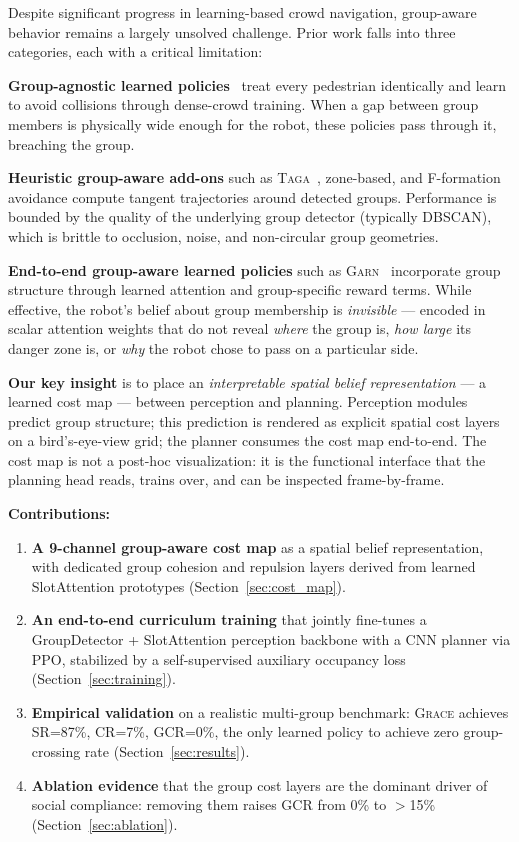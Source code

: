 \documentclass{article}
\newcommand{\grace}{\textsc{Grace}}
\newcommand{\garn}{\textsc{Garn}}
\newcommand{\taga}{\textsc{Taga}}
\begin{document}
Despite significant progress in learning-based crowd navigation, group-aware
behavior remains a largely unsolved challenge. Prior work falls into three
categories, each with a critical limitation:

\textbf{Group-agnostic learned policies}~\citep{liu2021decentralized,chen2019crowd}
treat every pedestrian identically and learn to avoid collisions through
dense-crowd training. When a gap between group members is physically
wide enough for the robot, these policies pass through it, breaching the group.

\textbf{Heuristic group-aware add-ons} such as
\taga{}~\citep{roy2025taga}, zone-based, and F-formation avoidance compute
tangent trajectories around detected groups. Performance is bounded by the
quality of the underlying group detector (typically DBSCAN), which is brittle
to occlusion, noise, and non-circular group geometries.

\textbf{End-to-end group-aware learned policies} such as
\garn{}~\citep{lu2025garn} incorporate group structure through learned attention
and group-specific reward terms. While effective, the robot's belief about group
membership is \emph{invisible} — encoded in scalar attention weights that do not
reveal \emph{where} the group is, \emph{how large} its danger zone is, or
\emph{why} the robot chose to pass on a particular side.

\textbf{Our key insight} is to place an \emph{interpretable spatial belief
representation} — a learned cost map — between perception and planning. Perception
modules predict group structure; this prediction is rendered as explicit spatial
cost layers on a bird's-eye-view grid; the planner consumes the cost map end-to-end.
The cost map is not a post-hoc visualization: it is the functional interface that the
planning head reads, trains over, and can be inspected frame-by-frame.

\textbf{Contributions:}
\begin{enumerate}
  \item \textbf{A 9-channel group-aware cost map} as a spatial belief representation,
        with dedicated group cohesion and repulsion layers derived from
        learned SlotAttention prototypes (Section~\ref{sec:cost_map}).
  \item \textbf{An end-to-end curriculum training} that jointly fine-tunes
        a GroupDetector + SlotAttention perception backbone with a CNN planner
        via PPO, stabilized by a self-supervised auxiliary occupancy loss
        (Section~\ref{sec:training}).
  \item \textbf{Empirical validation} on a realistic multi-group benchmark:
        \grace{} achieves SR=87\%, CR=7\%, GCR=0\%, the only learned policy
        to achieve zero group-crossing rate (Section~\ref{sec:results}).
  \item \textbf{Ablation evidence} that the group cost layers are the dominant
        driver of social compliance: removing them raises GCR from
        0\% to $>$15\% (Section~\ref{sec:ablation}).
\end{enumerate}
\end{document}
